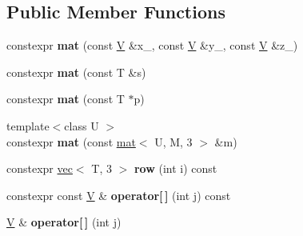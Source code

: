 \subsection*{Public Member Functions}
\begin{DoxyCompactItemize}
\item 
constexpr {\bfseries mat} (const \hyperlink{structlinalg_1_1vec}{V} \&x\+\_\+, const \hyperlink{structlinalg_1_1vec}{V} \&y\+\_\+, const \hyperlink{structlinalg_1_1vec}{V} \&z\+\_\+)\hypertarget{structlinalg_1_1mat_3_01T_00_01M_00_013_01_4_a2c068dacf31edb932f8066665e6f74fa}{}\label{structlinalg_1_1mat_3_01T_00_01M_00_013_01_4_a2c068dacf31edb932f8066665e6f74fa}

\item 
constexpr {\bfseries mat} (const T \&s)\hypertarget{structlinalg_1_1mat_3_01T_00_01M_00_013_01_4_a8fc852e680a1fce7507bd6bde4e552ab}{}\label{structlinalg_1_1mat_3_01T_00_01M_00_013_01_4_a8fc852e680a1fce7507bd6bde4e552ab}

\item 
constexpr {\bfseries mat} (const T $\ast$p)\hypertarget{structlinalg_1_1mat_3_01T_00_01M_00_013_01_4_a8cd12da96d49f62e5b1175569dc9b2f5}{}\label{structlinalg_1_1mat_3_01T_00_01M_00_013_01_4_a8cd12da96d49f62e5b1175569dc9b2f5}

\item 
{\footnotesize template$<$class U $>$ }\\constexpr {\bfseries mat} (const \hyperlink{structlinalg_1_1mat}{mat}$<$ U, M, 3 $>$ \&m)\hypertarget{structlinalg_1_1mat_3_01T_00_01M_00_013_01_4_a37b7648ca101254eda874e491c03f61f}{}\label{structlinalg_1_1mat_3_01T_00_01M_00_013_01_4_a37b7648ca101254eda874e491c03f61f}

\item 
constexpr \hyperlink{structlinalg_1_1vec}{vec}$<$ T, 3 $>$ {\bfseries row} (int i) const \hypertarget{structlinalg_1_1mat_3_01T_00_01M_00_013_01_4_abc70fe0e309147373fbfdafcc7059e2f}{}\label{structlinalg_1_1mat_3_01T_00_01M_00_013_01_4_abc70fe0e309147373fbfdafcc7059e2f}

\item 
constexpr const \hyperlink{structlinalg_1_1vec}{V} \& {\bfseries operator\mbox{[}$\,$\mbox{]}} (int j) const \hypertarget{structlinalg_1_1mat_3_01T_00_01M_00_013_01_4_aee781608d0a344d8a4f3ad6075057142}{}\label{structlinalg_1_1mat_3_01T_00_01M_00_013_01_4_aee781608d0a344d8a4f3ad6075057142}

\item 
\hyperlink{structlinalg_1_1vec}{V} \& {\bfseries operator\mbox{[}$\,$\mbox{]}} (int j)\hypertarget{structlinalg_1_1mat_3_01T_00_01M_00_013_01_4_a0ed70aa2ee7678be381e53a5a9e0f297}{}\label{structlinalg_1_1mat_3_01T_00_01M_00_013_01_4_a0ed70aa2ee7678be381e53a5a9e0f297}

\end{DoxyCompactItemize}
